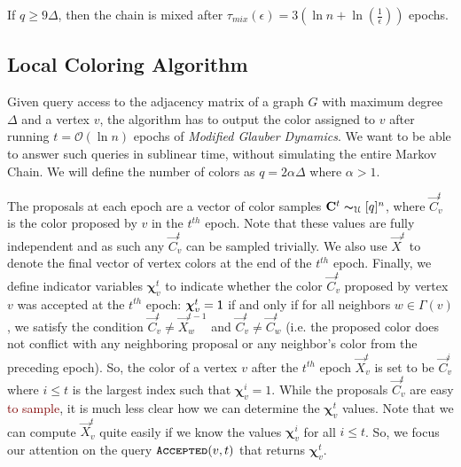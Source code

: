\begin{corollary}
\label{cor:modified_mixing_time}
If $q\ge 9\Delta$, then the chain is mixed after $\tau_{mix}(\epsilon) = 3\left( \ln n + \ln(\frac1{\epsilon})\right)$ epochs.
\end{corollary}



\subsection{Local Coloring Algorithm}%
\label{sec:local_coloring_algortihm}
Given query access to the adjacency matrix of a graph $G$ with maximum degree $\Delta$ and a vertex $v$,
the algorithm has to output the color assigned to $v$ after running $t = \mathcal O(\ln n)$ epochs of \emph{Modified Glauber Dynamics}.
We want to be able to answer such queries in sublinear time, without simulating the entire Markov Chain.
We will define the number of colors as $q = 2\alpha\Delta$ where $\alpha > 1$.

The proposals at each epoch are a vector of color samples $\vec C^{t} \thicksim_{\mathcal U} [q]^n$,
where $\vec C^t_v$ is the color proposed by $v$ in the $t^{th}$ epoch.
Note that these values are fully independent and as such any $\vec C^t_v$ can be sampled trivially.
We also use $\vec X^t$ to denote the final vector of vertex colors at the end of the $t^{th}$ epoch.
Finally, we define indicator variables $\bm \chi^t_v$ to indicate whether the color $\vec C^t_v$ proposed by vertex $v$
was accepted at the $t^{th}$ epoch: $\bm \chi^t_v = \ONE$ if and only if for all neighbors $w\in \Gamma(v)$,
we satisfy the condition $\vec C^t_v\not= \vec X^{t-1}_w$ and $\vec C^t_v\not= \vec C^t_w$
(i.e. the proposed color does not conflict with any neighboring proposal or any neighbor's color from the preceding epoch).
So, the color of a vertex $v$ after the $t^{th}$ epoch $\vec X^t_v$ is set to be $\vec C^i_v$
where $i\le t$ is the largest index such that $\bm \chi^i_v=1$.
While the proposals $\vec C^t_v$ are easy \textcolor{Maroon}{to sample}, it is much less clear how we can determine the $\bm \chi^t_v$ values.
Note that we can compute $\vec X^t_v$ quite easily if we know the values $\bm\chi^i_v$ for all $i\le t$.
So, we focus our attention on the query $\func{Accepted}(v,t)$ that returns $\bm\chi^t_v$.


